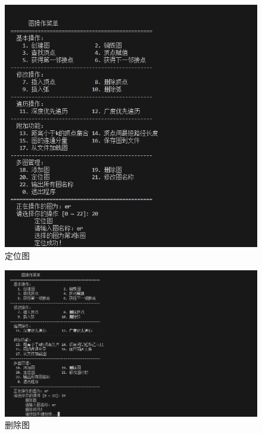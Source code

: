 \documentclass[supercite]{Experimental_Report}
\theoremstyle{definition}
\begin{document}
\begin{figure}[htb]
    \begin{center}
        \includegraphics[scale=0.30]{images/2-16.jpg}
        \caption{定位图}
        \label{fig2-16}
    \end{center}
\end{figure}

\begin{figure}[htb]
    \begin{center}
        \includegraphics[scale=0.30]{images/2-17.jpg}
        \caption{删除图}
        \label{fig2-17}
    \end{center}
\end{figure}
\end{document}
